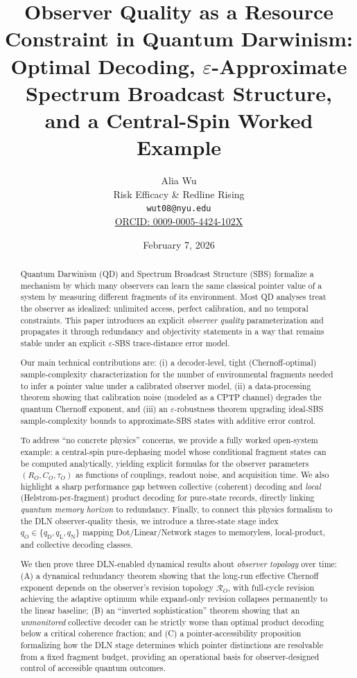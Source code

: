 \documentclass[11pt]{article}
\title{\bf Observer Quality as a Resource Constraint in Quantum Darwinism:\\
Optimal Decoding, $\varepsilon$-Approximate Spectrum Broadcast Structure,\\
and a Central-Spin Worked Example}
\author{
Alia Wu\\
Risk Efficacy \& Redline Rising\\
\texttt{wut08@nyu.edu}\\
\href{https://orcid.org/0009-0005-4424-102X}{ORCID: 0009-0005-4424-102X}
}
\date{February 7, 2026}
\newcommand{\cR}{\mathcal{R}}
\newcommand{\1}{\mathbf{1}}
\theoremstyle{definition}
\theoremstyle{plain}
\begin{document}
\maketitle

\begin{abstract}
Quantum Darwinism (QD) and Spectrum Broadcast Structure (SBS) formalize a mechanism by which many observers can learn the same classical pointer value of a system by measuring different fragments of its environment.
Most QD analyses treat the observer as idealized: unlimited access, perfect calibration, and no temporal constraints.
This paper introduces an explicit \emph{observer quality} parameterization and propagates it through redundancy and objectivity statements in a way that remains stable under an explicit $\varepsilon$-SBS trace-distance error model.

Our main technical contributions are:
(i) a decoder-level, tight (Chernoff-optimal) sample-complexity characterization for the number of environmental fragments needed to infer a pointer value under a calibrated observer model,
(ii) a data-processing theorem showing that calibration noise (modeled as a CPTP channel) degrades the quantum Chernoff exponent, and
(iii) an $\varepsilon$-robustness theorem upgrading ideal-SBS sample-complexity bounds to approximate-SBS states with additive error control.

To address ``no concrete physics'' concerns, we provide a fully worked open-system example: a central-spin pure-dephasing model whose conditional fragment states can be computed analytically, yielding explicit formulas for the observer parameters $(R_O,C_O,\tau_O)$ as functions of couplings, readout noise, and acquisition time.
We also highlight a sharp performance gap between collective (coherent) decoding and \emph{local} (Helstrom-per-fragment) product decoding for pure-state records, directly linking \emph{quantum memory horizon} to redundancy.
Finally, to connect this physics formalism to the DLN observer-quality thesis, we introduce a three-state stage index $q_O\in\{q_{\mathrm{D}},q_{\mathrm{L}},q_{\mathrm{N}}\}$ mapping Dot/Linear/Network stages to memoryless, local-product, and collective decoding classes.

We then prove three DLN-enabled dynamical results about \emph{observer topology} over time: (A) a dynamical redundancy theorem showing that the long-run effective Chernoff exponent depends on the observer's revision topology $\cR_O$, with full-cycle revision achieving the adaptive optimum while expand-only revision collapses permanently to the linear baseline; (B) an ``inverted sophistication'' theorem showing that an \emph{unmonitored} collective decoder can be strictly worse than optimal product decoding below a critical coherence fraction; and (C) a pointer-accessibility proposition formalizing how the DLN stage determines which pointer distinctions are resolvable from a fixed fragment budget, providing an operational basis for observer-designed control of accessible quantum outcomes.
\end{abstract}
\end{document}

